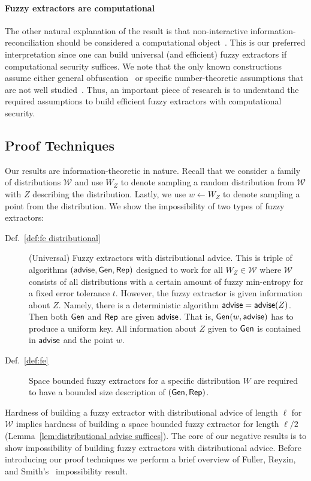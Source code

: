 \paragraph{Fuzzy extractors are computational} The other natural explanation of the result is that non-interactive information-reconciliation should be considered a computational object~\cite{fuller2020computational}. This is our preferred interpretation since one can build universal (and efficient) fuzzy extractors if computational security suffices.  We note that the only known constructions assume either general obfuscation~\cite{BarakBCKPS13,BitanskyCKP14,bitansky2017virtual} or specific number-theoretic assumptions that are not well studied~\cite{galbraith2019obfuscated}. Thus, an important piece of research  is to understand the required assumptions to build efficient fuzzy extractors with computational security. 

\subsection{Proof Techniques}
Our results are information-theoretic in nature. Recall that we consider a family of distributions $\mathcal{W}$ and use $W_Z$ to denote sampling a random distribution from $\mathcal{W}$ with $Z$ describing the distribution.  Lastly, we use $w\leftarrow W_Z$ to denote sampling a point from the distribution.  We show the impossibility of two types of fuzzy extractors:
\begin{description}
\item[Def.~\ref{def:fe distributional}] (Universal) Fuzzy extractors with distributional advice.  This is triple of algorithms $({\mathsf{advise}}, {\mathsf{Gen}}, {\mathsf{Rep}})$ designed to work for all $W_Z \in \mathcal{W}$ where $\mathcal{W}$ consists of all distributions with a certain amount of fuzzy min-entropy for a fixed error tolerance $t$.  However, the fuzzy extractor is given information about $Z$.  Namely, there is a deterministic algorithm ${\mathsf{advise}} = {\mathsf{advise}}(Z)$. Then both ${\mathsf{Gen}}$ and ${\mathsf{Rep}}$ are given ${\mathsf{advise}}$.  That is, ${\mathsf{Gen}}(w, {\mathsf{advise}})$ has to produce a uniform key.  All information about $Z$ given to ${\mathsf{Gen}}$ is contained in ${\mathsf{advise}}$ and the point $w$.
\item[Def.~\ref{def:fe}] Space bounded fuzzy extractors for a specific distribution $W$ are required to have a bounded size description of $({\mathsf{Gen}}, {\mathsf{Rep}})$.
\end{description}

Hardness of building a fuzzy extractor with distributional advice of length $\ell$ for $\mathcal{W}$ implies hardness of building a space bounded fuzzy extractor for length $\ell/2$ (Lemma~\ref{lem:distributional advise suffices}). 
The core of our negative results is to show impossibility of building fuzzy extractors with distributional advice.   Before introducing our proof techniques we perform a brief overview of Fuller, Reyzin, and Smith's~\cite{fuller2020fuzzy} impossibility result.

